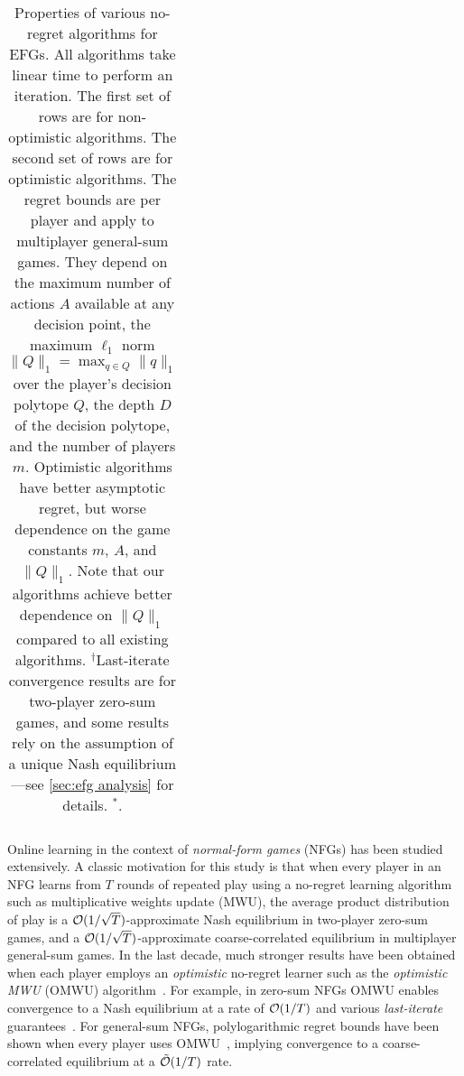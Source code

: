 {\begin{table*}[th]
{\begin{tabular}{m{10cm}m{5cm}>{\centering\arraybackslash}m{1.6cm}}
                \bottomrule
            \end{tabular}}
        \caption{
            Properties of various no-regret algorithms for EFGs.
            All algorithms take linear time to perform an iteration.
            The first set of rows are for non-optimistic algorithms. The second set of rows are for optimistic algorithms.
            The regret bounds are per player and apply to multiplayer general-sum games. They depend on the maximum number of actions $A$ available at any decision point, the maximum $\ell_1$ norm $\|Q\|_1 = \max_{q\in Q} \|q\|_1$ over the player's decision polytope $Q$, the depth $D$ of the decision polytope, and the number of players $m$.
            Optimistic algorithms have better asymptotic regret, but worse dependence on the game constants $m$, $A$, and $\|Q\|_1$.
            Note that our algorithms achieve better dependence on $\|Q\|_1$ compared to all existing algorithms.
            $^\dagger$Last-iterate convergence results are for two-player zero-sum games, and some results rely on the assumption of a unique Nash equilibrium---see \cref{sec:efg analysis} for details.
            $^*$\citet{Lee21:Last}.
        }
        \label{tab:bounds}
    \end{table*}
}
\comparisontablehere


Online learning in the context of \emph{normal-form games} (NFGs) has been studied extensively.
A classic motivation for this study is that when every player in an NFG learns from $T$ rounds of repeated play using a no-regret learning algorithm such as multiplicative weights update (MWU), the average product distribution of play is a $\mathcal{O}(1/\sqrt{T})$-approximate Nash equilibrium in two-player zero-sum games, and a $\mathcal{O}(1/\sqrt{T})$-approximate coarse-correlated equilibrium in multiplayer general-sum games.
In the last decade, much stronger results have been obtained when each player employs an \emph{optimistic} no-regret learner such as the \emph{optimistic MWU} (OMWU) algorithm~\citep{Rakhlin13:Online,Rakhlin13:Optimization,Syrgkanis15:Fast}.
For example, in zero-sum NFGs OMWU enables convergence to a Nash equilibrium at a rate of $\mathcal{O}(1/T)$ and various \emph{last-iterate} guarantees~\citep{Daskalakis18:Last,Lei21:Last,Wei21:Linear}. For general-sum NFGs, polylogarithmic regret bounds have been shown when every player uses OMWU~\citep{Daskalakis21:Near}, implying convergence to a coarse-correlated equilibrium at a $\tilde{\mathcal{O}}(1/T)$ rate.

